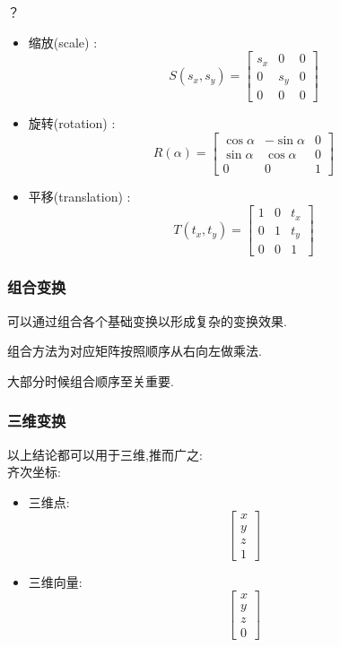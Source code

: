 {{{      {？}
      \begin{itemize}
        \item 缩放(scale) : $$S(s_x, s_y) = \begin{bmatrix}
                  s_x & 0   & 0 \\
                  0   & s_y & 0 \\
                  0   & 0   & 0
                \end{bmatrix}$$
        \item 旋转(rotation) : $$R(\alpha) = \begin{bmatrix}
                  \cos\alpha & -\sin\alpha & 0 \\
                  \sin\alpha & \cos\alpha  & 0 \\
                  0          & 0           & 1
                \end{bmatrix}$$
        \item 平移(translation) : $$T(t_x, t_y) = \begin{bmatrix}
                  1 & 0 & t_x \\
                  0 & 1 & t_y \\
                  0 & 0 & 1
                \end{bmatrix}$$
      \end{itemize}

    }%

    \subsubsection{组合变换}{
      可以通过组合各个基础变换以形成复杂的变换效果.

      组合方法为对应矩阵按照顺序从右向左做乘法.

      大部分时候组合顺序至关重要.

    }%

    \subsubsection{三维变换}{
      以上结论都可以用于三维,推而广之:\\

      齐次坐标:\begin{itemize}
        \item 三维点:$$\begin{bmatrix}
                  x \\
                  y \\
                  z \\
                  1
                \end{bmatrix}$$
        \item 三维向量:$$\begin{bmatrix}
                  x \\
                  y \\
                  z \\
                  0
                \end{bmatrix}$$
      \end{itemize}

}}}
